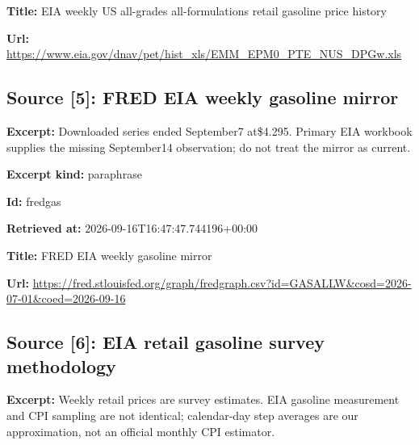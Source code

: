 \documentclass[11pt]{article}
\begin{document}
\par\noindent\textbf{Title:} EIA weekly US all-grades all-formulations retail gasoline price history

\par\noindent\textbf{Url:} \href{https://www.eia.gov/dnav/pet/hist\_xls/EMM\_EPM0\_PTE\_NUS\_DPGw.xls}{https://www.\hspace{0pt}eia.gov/dnav\hspace{0pt}/pet/hist\_xl\hspace{0pt}s/EMM\_EPM0\_P\hspace{0pt}TE\_NUS\_DPGw.\hspace{0pt}xls}

\subsection*{\textcolor{epdarkgreen}{Source [5]: FRED EIA weekly gasoline mirror}}
\par\noindent\textbf{Excerpt:} Downloaded series ended September7 at\$4.295. Primary EIA workbook supplies the missing September14 observation; do not treat the mirror as current.

\par\noindent\textbf{Excerpt kind:} paraphrase

\par\noindent\textbf{Id:} fredgas

\par\noindent\textbf{Retrieved at:} 2026-09-16T1\hspace{0pt}6:47:47.7441\hspace{0pt}96+00:00

\par\noindent\textbf{Title:} FRED EIA weekly gasoline mirror

\par\noindent\textbf{Url:} \href{https://fred.stlouisfed.org/graph/fredgraph.csv?id=GASALLW\&cosd=2026-07-01\&coed=2026-09-16}{https://fred\hspace{0pt}.stlouisfed.\hspace{0pt}org/graph/fr\hspace{0pt}edgraph.csv?\hspace{0pt}id=GASALLW\&c\hspace{0pt}osd=2026-07-\hspace{0pt}01\&coed=2026\hspace{0pt}-09-16}

\subsection*{\textcolor{epdarkgreen}{Source [6]: EIA retail gasoline survey methodology}}
\par\noindent\textbf{Excerpt:} Weekly retail prices are survey estimates. EIA gasoline measurement and CPI sampling are not identical; calendar-day step averages are our approximation, not an official monthly CPI estimator.
\end{document}
